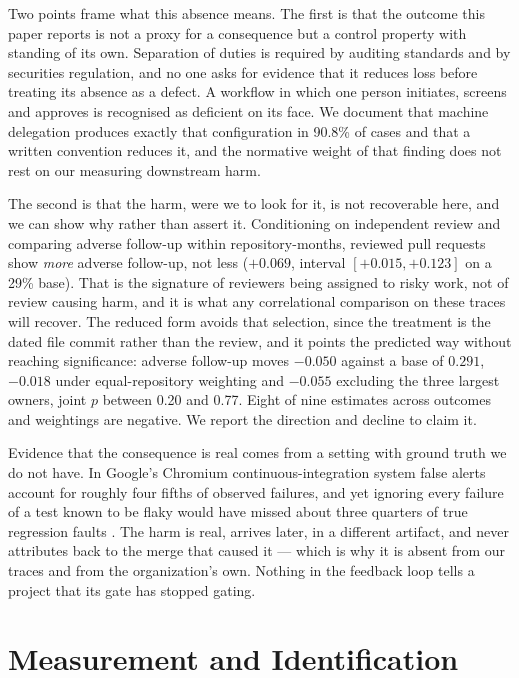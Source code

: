 \documentclass[mnsc]{informs4}
\begin{document}
Two points frame what this absence means. The first is that the outcome this paper
reports is not a proxy for a consequence but a control property with standing of
its own. Separation of duties is required by auditing standards and by securities
regulation, and no one asks for evidence that it reduces loss before treating its
absence as a defect. A workflow in which one person initiates, screens and
approves is recognised as deficient on its face. We document that machine
delegation produces exactly that configuration in 90.8\% of cases and that a
written convention reduces it, and the normative weight of that finding does not
rest on our measuring downstream harm.

The second is that the harm, were we to look for it, is not recoverable here, and
we can show why rather than assert it. Conditioning on independent review and
comparing adverse follow-up within repository-months, reviewed pull requests show
\emph{more} adverse follow-up, not less ($+0.069$, interval $[+0.015, +0.123]$ on
a 29\% base). That is the signature of reviewers being assigned to risky work, not
of review causing harm, and it is what any correlational comparison on these
traces will recover. The reduced form avoids that selection, since the treatment
is the dated file commit rather than the review, and it points the predicted way
without reaching significance: adverse follow-up moves $-0.050$ against a base of
$0.291$, $-0.018$ under equal-repository weighting and $-0.055$ excluding the
three largest owners, joint $p$ between 0.20 and 0.77. Eight of nine estimates
across outcomes and weightings are negative. We report the direction and decline
to claim it.

Evidence that the consequence is real comes from a setting with ground truth we do
not have. In Google's Chromium continuous-integration system false alerts account
for roughly four fifths of observed failures, and yet ignoring every failure of a
test known to be flaky would have missed about three quarters of true regression
faults \citep{haben2023chromium}. The harm is real, arrives later, in a
different artifact, and never attributes back to the merge that caused it --- which
is why it is absent from our traces and from the organization's own. Nothing in the
feedback loop tells a project that its gate has stopped gating.

\section{Measurement and Identification}
\label{sec:measurement}
\label{sec:audit}
\end{document}
